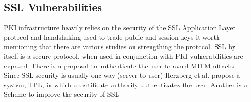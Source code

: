 \documentclass[10pt,twocolumn,pdftex]{article}
\begin{document}
\subsection{SSL Vulnerabilities}

PKI infrastructure heavily relies on the security of the SSL Application Layer protocol and handshaking used to trade public and session keys it worth mentioning that there are various studies on strengthing the protocol. SSL by itself is a secure protocol, when used in conjunction with PKI vulnerabilities are exposed. There is a proposal to authenticate the user to avoid MITM attacks. Since SSL security is usually one way (server to user) Herzberg et al. propose a system, TPL, in which a certificate authority authenticates the user. \cite{herzberg2000access} Another is a Scheme to improve the security of SSL - \cite{huawei2009scheme}\cite{soghoian2012certified}







\end{document}
